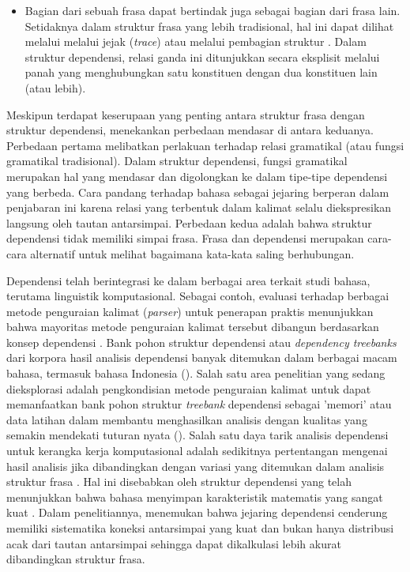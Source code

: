\begin{itemize}
\item Bagian dari sebuah frasa dapat bertindak juga sebagai bagian dari frasa lain. Setidaknya dalam struktur frasa yang lebih tradisional, hal ini dapat dilihat melalui melalui jejak (\textit{trace}) \citep{chomsky1986barriers} atau melalui pembagian struktur \citep{pollard1994head}. Dalam struktur dependensi, relasi ganda ini ditunjukkan secara eksplisit melalui panah yang menghubungkan satu konstituen dengan dua konstituen lain (atau lebih).
\end{itemize}

Meskipun terdapat keserupaan yang penting antara struktur frasa dengan struktur dependensi, \cite{hudson2007language} menekankan perbedaan mendasar di antara keduanya. Perbedaan pertama melibatkan perlakuan terhadap relasi gramatikal (atau fungsi gramatikal tradisional). Dalam struktur dependensi, fungsi gramatikal merupakan hal yang mendasar dan digolongkan ke dalam tipe-tipe dependensi yang berbeda. Cara pandang \cite{hudson2007language} terhadap bahasa sebagai jejaring berperan dalam penjabaran ini karena relasi yang terbentuk dalam kalimat selalu diekspresikan langsung oleh tautan antarsimpai. Perbedaan kedua adalah bahwa struktur dependensi tidak memiliki simpai frasa. Frasa dan dependensi merupakan cara-cara alternatif untuk melihat bagaimana kata-kata saling berhubungan.  

Dependensi telah berintegrasi ke dalam berbagai area terkait studi bahasa, terutama linguistik komputasional. Sebagai contoh, evaluasi terhadap berbagai metode penguraian kalimat (\textit{parser}) untuk penerapan praktis menunjukkan bahwa mayoritas metode penguraian kalimat tersebut dibangun berdasarkan konsep dependensi \citep{molla2000answer}. Bank pohon struktur dependensi atau \textit{dependency treebanks} dari korpora hasil analisis dependensi banyak ditemukan dalam berbagai macam bahasa, termasuk bahasa Indonesia (\citealp{marcus1993building, abeille2004enriching, carroll2003parser, lin2003dependency, green2012indonesian}). Salah satu area penelitian yang sedang dieksplorasi adalah pengkondisian metode penguraian kalimat untuk dapat memanfaatkan bank pohon struktur \textit{treebank} dependensi sebagai 'memori' atau data latihan dalam membantu menghasilkan analisis dengan kualitas yang semakin mendekati tuturan nyata (\citealp{nivre2006maltparser, nivre2004incrementality}). Salah satu daya tarik analisis dependensi untuk kerangka kerja komputasional adalah sedikitnya pertentangan mengenai hasil analisis jika dibandingkan dengan variasi yang ditemukan dalam analisis struktur frasa \citep{carroll2003parser}. Hal ini disebabkan oleh struktur dependensi yang telah menunjukkan bahwa bahasa menyimpan karakteristik matematis yang sangat kuat \citep{i2004patterns}. Dalam penelitiannya, \cite{i2004patterns} menemukan bahwa jejaring dependensi cenderung memiliki sistematika koneksi antarsimpai yang kuat dan bukan hanya distribusi acak dari tautan antarsimpai sehingga dapat dikalkulasi lebih akurat dibandingkan struktur frasa.


